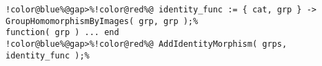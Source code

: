\begin{Verbatim}[commandchars=!@\%,frame=single]
!color@blue%@gap>%!color@red%@ identity_func := { cat, grp } -> GroupHomomorphismByImages( grp, grp );%
function( grp ) ... end
!color@blue%@gap>%!color@red%@ AddIdentityMorphism( grps, identity_func );%
\end{Verbatim}

